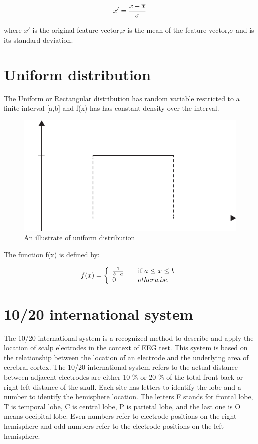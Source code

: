 \[x' = {x-{\overline{x}} \over {\sigma}}\] 

where $x'$ is the original feature vector,$\overline{x}$ is the mean of the feature vector,$\sigma$ and is its standard deviation.

\section{Uniform distribution\cite{ref11}}

\hspace{1.5cm} The Uniform or Rectangular distribution has random variable  restricted to a finite interval [a,b] and f(x) has  has constant density over the interval.

\begin{figure}[ht]
	\centering
	\includegraphics[scale = 0.8]{chapter3/34.pdf}
	\caption{An illustrate of uniform distribution}
\end{figure}

\newpage
The function f(x) is defined by:

\[f(x) = \left\{ 
\begin{array}{l l}
  {1 \over b-a} & \quad \mbox{if $a$ $\leq x$ $\leq b$}\\
  0 & \quad \mbox{$otherwise$}\\ \end{array} \right. \]

\section{10/20 international system}
\hspace{1.5cm} The 10/20 international system is a recognized method to describe and apply the location of scalp electrodes in the context of EEG test. This system is based on the relationship between the location of an electrode and the underlying area of cerebral cortex. The 10/20 international system refers to the actual distance between adjacent electrodes are either 10 \% or 20 \% of the total front-back or right-left distance of the skull. Each site has letters to identify the lobe and a number to identify the hemisphere location. The letters F stands for frontal lobe, T is temporal lobe, C is central lobe, P is parietal lobe, and the last one is O means occipital lobe. Even numbers refer to electrode positions on the right hemisphere and odd numbers refer to the electrode positions on the left hemisphere.


